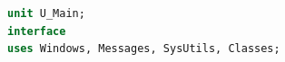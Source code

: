 \chapter{}
\begin{lstlisting}[language=Pascal,caption={\ploren{Przykładowy fragment kodu}{Example source code}}]
unit U_Main;
interface
uses Windows, Messages, SysUtils, Classes;
\end{lstlisting}

